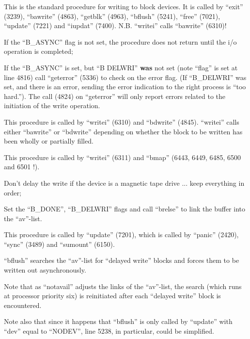 
This is the standard procedure for
writing to block devices. It is called
by ``exit'' (3239), ``bawrite'' (4863),
``getblk'' (4963), ``bflush'' (5241),
``free'' (7021), ``update'' (7221) and
``iupdat'' (7400). N.B. ``writei'' calls
``bawrite'' (6310)!

\bd
\item[4820:] If the ``B\_ASYNC'' flag is not set,
 the procedure does not return
 until the i/o operation is completed;

\item[4823:] If the ``B\_ASYNC''  is set, but
``B DELWRI'' {\bf was} not set (note
``flag'' is set at line 4816) call
``geterror'' (5336) to check on the
error flag. (If ``B\_DELWRI'' was
set, and there is an error, sending the error indication to the
right process is ``too hard.'').
The call (4824) on ``geterror''
will only report errors related
to the initiation of the write
operation.
\ed


This procedure is called by ``writei''
(6310) and ``bdwrite'' (4845). ``writei''
calls either ``bawrite'' or ``bdwrite''
depending on whether the block to be
written has been wholly or partially
filled.



This procedure is called by ``writei''
(6311) and ``bmap'' (6443, 6449, 6485,
6500 and 6501 !).

\bd
\item[4844:] Don't delay the write if the device is a magnetic tape drive ...
 keep everything in order;

\item[4847:] Set the ``B\_DONE'', ``B\_DELWRI''
 flags and call ``brelse'' to link
 the buffer into the ``av''-list.
\ed


This procedure is called by ``update''
(7201), which is called by ``panic''
(2420), ``sync'' (3489) and ``sumount''
(6150).

``bflush'' searches the ``av''-list for
``delayed write'' blocks and forces them
to be written out asynchronously.

Note that as ``notavail'' adjusts the
links of the ``av''-list, the search
(which runs at processor priority six)
is reinitiated after each ``delayed
write'' block is encountered.

Note also that since it happens that
``bflush'' is only called by ``update''
with ``dev'' equal to ``NODEV'', line 5238,
in particular, could be simplified.


